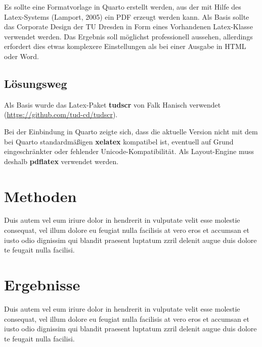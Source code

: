 \documentclass[
  11pt,
  a4paper,
]{tudscrreprt}
\begin{document}
Es sollte eine Formatvorlage in Quarto erstellt werden, aus der mit
Hilfe des Latex-Systems (Lamport, 2005) ein PDF erzeugt werden kann. Als
Basis sollte das Corporate Design der TU Dresden in Form eines
Vorhandenen Latex-Klasse verwendet werden. Das Ergebnis soll möglichst
professionell aussehen, allerdings erfordert dies etwas komplexere
Einstellungen als bei einer Ausgabe in HTML oder Word.

\section{Lösungsweg}\label{luxf6sungsweg}

Als Basis wurde das Latex-Paket \textbf{tudscr} von Falk Hanisch
verwendet (\url{https://github.com/tud-cd/tudscr}).

Bei der Einbindung in Quarto zeigte sich, dass die aktuelle Version
nicht mit dem bei Quarto standardmäßigen \textbf{xelatex} kompatibel
ist, eventuell auf Grund eingeschränkter oder fehlender
Unicode-Kompatibilität. Als Layout-Engine muss deshalb \textbf{pdflatex}
verwendet werden.

\chapter{Methoden}\label{methoden}

Duis autem vel eum iriure dolor in hendrerit in vulputate velit esse
molestie consequat, vel illum dolore eu feugiat nulla facilisis at vero
eros et accumsan et iusto odio dignissim qui blandit praesent luptatum
zzril delenit augue duis dolore te feugait nulla facilisi.

\chapter{Ergebnisse}\label{ergebnisse}

Duis autem vel eum iriure dolor in hendrerit in vulputate velit esse
molestie consequat, vel illum dolore eu feugiat nulla facilisis at vero
eros et accumsan et iusto odio dignissim qui blandit praesent luptatum
zzril delenit augue duis dolore te feugait nulla facilisi.
\end{document}
